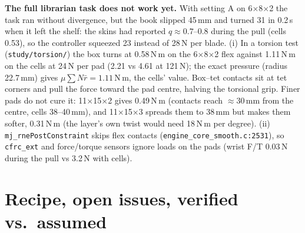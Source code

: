 \documentclass[10pt,twocolumn]{article}
\newcommand{\code}[1]{\texttt{\small #1}}
\newcommand{\src}[1]{\texttt{\footnotesize #1}}
\begin{document}
\textbf{The full librarian task does not work yet.} With setting A on 6$\times$8$\times$2 the task ran without
divergence, but the book slipped 45\,mm and turned 31\textdegree{} in 0.2\,s when it left the shelf: the skins had
reported $q\approx0.7$--0.8 during the pull (cells 0.53), so the controller squeezed 23 instead of 28\,N per blade.
(i) In a torsion test (\code{study/torsion/}) the box turns at 0.58\,N\,m on the 6$\times$8$\times$2 flex against
1.11\,N\,m on the cells at 24\,N per pad (2.21 vs 4.61 at 121\,N); the exact pressure (radius 22.7\,mm) gives
$\mu\sum N\bar r=1.11$\,N\,m, the cells' value. Box--tet contacts sit at tet corners and pull the force toward the
pad centre, halving the torsional grip. Finer pads do not cure it: 11$\times$15$\times$2 gives 0.49\,N\,m (contacts reach
$\approx$30\,mm from the centre, cells 38--40\,mm), and 11$\times$15$\times$3 spreads them to 38\,mm but makes them softer,
0.31\,N\,m (the layer's own twist would need 18\,N\,m per degree). (ii) \code{mj\_rnePostConstraint} skips flex contacts
(\src{engine\_core\_smooth.c:2531}), so \code{cfrc\_ext} and force/torque sensors ignore loads on the pads (wrist F/T
0.03\,N during the pull vs 3.2\,N with cells).

\section{Recipe, open issues, verified vs.\ assumed}
\label{sec:recipe}
\end{document}
